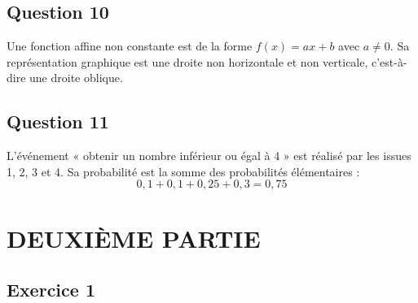 \documentclass[a4paper,12pt]{article}
\begin{document}

\subsection*{Question 10}
Une fonction affine non constante est de la forme $f(x) = ax + b$ avec $a \neq 0$. Sa représentation graphique est une droite non horizontale et non verticale, c'est-à-dire une droite oblique.


\subsection*{Question 11}
L'événement « obtenir un nombre inférieur ou égal à 4 » est réalisé par les issues 1, 2, 3 et 4.
Sa probabilité est la somme des probabilités élémentaires :
\[
0,1 + 0,1 + 0,25 + 0,3 = 0,75
\]


\newpage

\section*{DEUXIÈME PARTIE}

\subsection*{Exercice 1}
\end{document}
